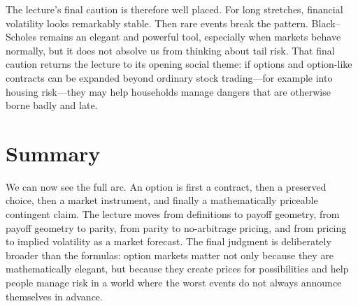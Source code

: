 The lecture's final caution is therefore well placed. For long stretches, financial volatility looks remarkably stable. Then rare events break the pattern. Black--Scholes remains an elegant and powerful tool, especially when markets behave normally, but it does not absolve us from thinking about tail risk. That final caution returns the lecture to its opening social theme: if options and option-like contracts can be expanded beyond ordinary stock trading---for example into housing risk---they may help households manage dangers that are otherwise borne badly and late.

\section{Summary}

We can now see the full arc. An option is first a contract, then a preserved choice, then a market instrument, and finally a mathematically priceable contingent claim. The lecture moves from definitions to payoff geometry, from payoff geometry to parity, from parity to no-arbitrage pricing, and from pricing to implied volatility as a market forecast. The final judgment is deliberately broader than the formulas: option markets matter not only because they are mathematically elegant, but because they create prices for possibilities and help people manage risk in a world where the worst events do not always announce themselves in advance.